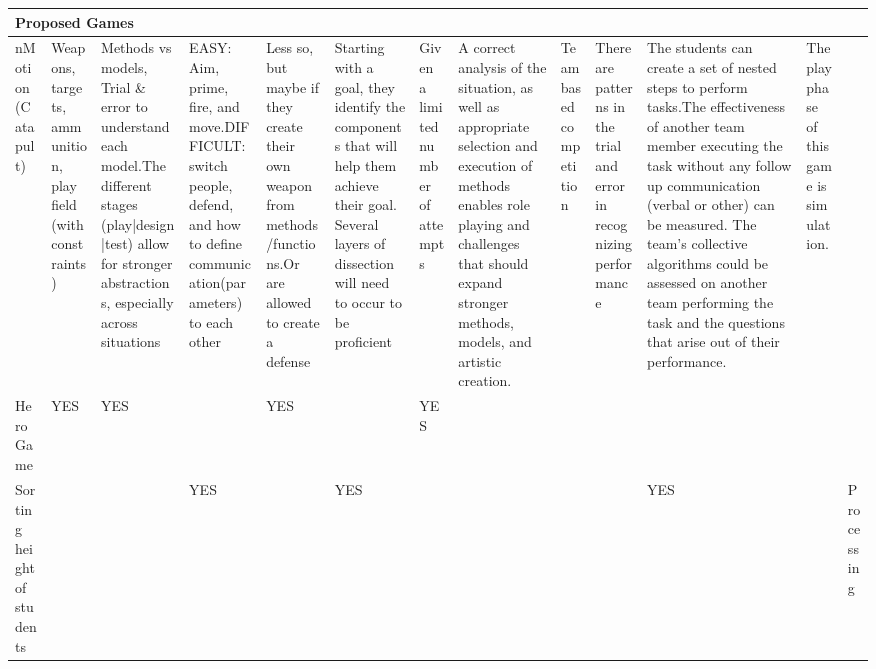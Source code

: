 \documentclass{acm_proc_article-sp}
\begin{document}
\begin{sidewaystable}[htbp]
\begin{tabular}{|p{1.3cm}||p{1cm}|p{2cm}|p{2cm}|p{1.6cm}|p{2cm}|p{1cm}|p{2cm}|p{1cm}|p{1.3cm}|p{2.7cm}|p{1cm}|p{1.6cm}|}

    \hline
    \multicolumn{13}{|l|}{Proposed Games} \\ \hline \hline

    nMotion (Catapult) & Weapons, targets, ammunition, play field (with constraints) & Methods vs models, Trial \& error to understand each model.\newline \newline The different stages (play|design|test) allow for stronger abstractions, especially across situations & EASY: Aim, prime, fire, and move.\newline \newline DIFFICULT: switch people, defend, and how to define communication(parameters) to each other & Less so, but maybe if they create their own weapon from methods/functions.\newline \newline Or are allowed to create a defense & Starting with a goal, they identify the components that will help them achieve their goal.   Several layers of dissection will need to occur to be proficient & Given a limited number of attempts & A correct analysis of the situation, as well as appropriate selection and execution of methods enables role playing and challenges that should expand stronger methods, models, and artistic creation. & Team based competition & There are patterns in the trial and error in recognizing performance & The students can create a set of nested steps to perform tasks.\newline \newline The effectiveness of another team member executing the task without any follow up communication (verbal or other) can be measured. The team's collective algorithms could be assessed on another team performing the task and the questions that arise out of their performance. & The play phase of this game is simulation. & ~ \\ \hline
    
    Hero Game & \cellcolor{blue!25}YES & \cellcolor{blue!25}YES & ~ & \cellcolor{blue!25}YES & ~ & \cellcolor{blue!25}YES & ~ & ~ & ~ & ~ & ~ & ~ \\ \hline
    
    Sorting height of students & ~ & ~ & \cellcolor{blue!25}YES & ~ & \cellcolor{blue!25}YES & ~ & ~ & ~ & ~ & \cellcolor{blue!25}YES & ~ & Processing \\ \hline
    

\end{tabular}
\end{sidewaystable}
\end{document}
